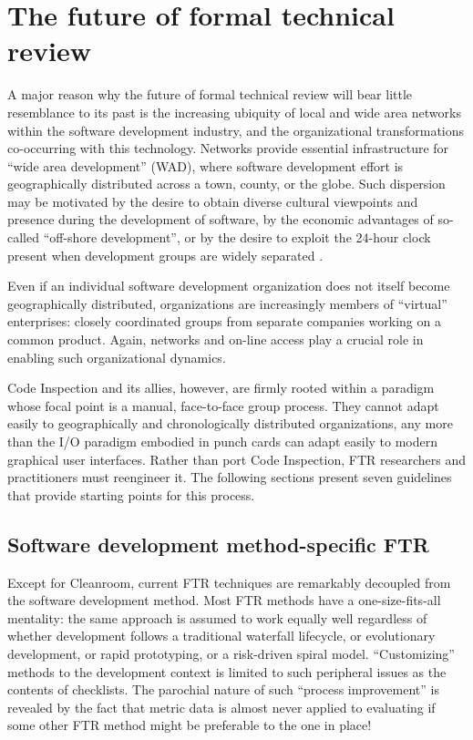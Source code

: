 \section*{The future of formal technical review}

A major reason why the future of formal technical review will bear little
resemblance to its past is the increasing ubiquity of local and wide area
networks within the software development industry, and the organizational
transformations co-occurring with this technology.  Networks provide
essential infrastructure for ``wide area development'' (WAD), where
software development effort is geographically distributed across a town,
county, or the globe.  Such dispersion may be motivated by the desire to
obtain diverse cultural viewpoints and presence during the development of
software, by the economic advantages of so-called ``off-shore
development'', or by the desire to exploit the 24-hour clock present when
development groups are widely separated \cite{Dedene95,Yourdon93}.

Even if an individual software development organization does not itself
become geographically distributed, organizations are increasingly 
members of ``virtual'' enterprises: closely coordinated groups from separate
companies working on a common product.  Again, networks and on-line access
play a crucial role in enabling such organizational dynamics. 

Code Inspection and its allies, however, are firmly rooted within a
paradigm whose focal point is a manual, face-to-face group process.  They
cannot adapt easily to geographically and chronologically distributed
organizations, any more than the I/O paradigm embodied in punch cards can
adapt easily to modern graphical user interfaces.
Rather than port Code Inspection, FTR researchers and practitioners must
reengineer it.  The following sections present seven guidelines that provide
starting points for this process.

\subsection*{Software development method-specific FTR}

Except for Cleanroom, current FTR techniques are remarkably decoupled from
the software development method.  Most FTR methods have a one-size-fits-all
mentality: the same approach is assumed to work equally well regardless of
whether development follows a traditional waterfall lifecycle, or
evolutionary development, or rapid prototyping, or a risk-driven spiral
model.  ``Customizing'' methods to the development context is limited to
such peripheral issues as the contents of checklists.  The parochial nature
of such ``process improvement'' is revealed by the fact that metric data is
almost never applied to evaluating if some other FTR method might be preferable to
the one in place!


